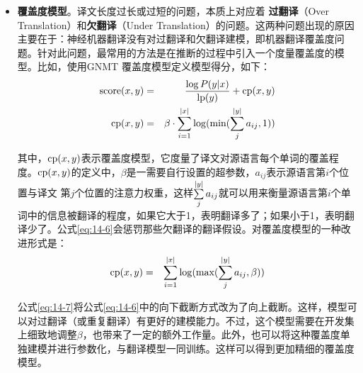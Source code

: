 \begin{itemize}
\item {\small\sffamily\bfseries{覆盖度模型}}。译文长度过长或过短的问题，本质上对应着 {\small\sffamily\bfseries{过翻译}}（Over Translation）和{\small\sffamily\bfseries{欠翻译}}（Under Translation）的问题。这两种问题出现的原因主要在于：神经机器翻译没有对过翻译和欠翻译建模，即机器翻译覆盖度问题。针对此问题，最常用的方法是在推断的过程中引入一个度量覆盖度的模型。比如，使用GNMT 覆盖度模型定义模型得分，如下：
\begin{eqnarray}
\textrm{score}({x},{y}) &=& \frac{\log {P}({y} | {x})}{\textrm{lp}({y})} + \textrm{cp}({x},{y}) \label {eq:14-5}\\
\textrm{cp}({x},{y}) &=& \beta \cdot \sum_{i=1}^{|{x}|} \log(\textrm{min} (\sum_{j}^{|{y}|} a_{ij} , 1))
\label{eq:14-6}
\end{eqnarray}

\noindent 其中，$\textrm{cp}({x},{y}) $表示覆盖度模型，它度量了译文对源语言每个单词的覆盖程度。$\textrm{cp}({x},{y}) $的定义中，$\beta$是一需要自行设置的超参数，$a_{ij}$表示源语言第$i$个位置与译文 第$j$个位置的注意力权重，这样$\sum \limits_{j}^{|{y}|} a_{ij}$就可以用来衡量源语言第$i$个单词中的信息被翻译的程度，如果它大于1，表明翻译多了；如果小于1，表明翻译少了。公式\eqref{eq:14-6}会惩罚那些欠翻译的翻译假设。对覆盖度模型的一种改进形式是：
\begin{eqnarray}
\textrm{cp}({x},{y}) &=& \sum_{i=1}^{|{x}|} \log( \textrm{max} ( \sum_{j}^{|{y}|} a_{ij},\beta))
\label{eq:14-7}
\end{eqnarray}

\noindent 公式\eqref{eq:14-7}将公式\eqref{eq:14-6}中的向下截断方式改为了向上截断。这样，模型可以对过翻译（或重复翻译）有更好的建模能力。不过，这个模型需要在开发集上细致地调整$\beta$，也带来了一定的额外工作量。此外，也可以将这种覆盖度单独建模并进行参数化，与翻译模型一同训练。这样可以得到更加精细的覆盖度模型。
\vspace{0.5em}
\end{itemize}


